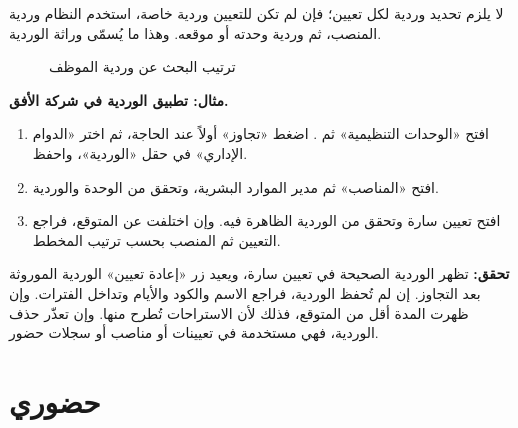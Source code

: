 لا يلزم تحديد وردية لكل تعيين؛ فإن لم تكن للتعيين وردية خاصة، استخدم النظام وردية المنصب، ثم وردية وحدته أو موقعه. وهذا ما يُسمّى وراثة الوردية.

\begin{figure}[H]
\centering
{}
\rclegend
\caption{ترتيب البحث عن وردية الموظف}
\label{fig:hr-shift-order}
\end{figure}


\textbf{مثال: تطبيق الوردية في شركة الأفق.}

\begin{enumerate}
  \item افتح «الوحدات التنظيمية» ثم . اضغط «تجاوز» أولاً عند الحاجة، ثم اختر «الدوام الإداري» في حقل «الوردية»، واحفظ.
  \item افتح «المناصب» ثم مدير الموارد البشرية، وتحقق من الوحدة والوردية.
  \item افتح تعيين سارة وتحقق من الوردية الظاهرة فيه. وإن اختلفت عن المتوقع، فراجع التعيين ثم المنصب بحسب ترتيب المخطط.
\end{enumerate}

\textbf{تحقق:} تظهر الوردية الصحيحة في تعيين سارة، ويعيد زر «إعادة تعيين» الوردية الموروثة بعد التجاوز. إن لم تُحفظ الوردية، فراجع الاسم والكود والأيام وتداخل الفترات. وإن ظهرت المدة أقل من المتوقع، فذلك لأن الاستراحات تُطرح منها. وإن تعذّر حذف الوردية، فهي مستخدمة في تعيينات أو مناصب أو سجلات حضور.

\clearpage
\section{حضوري}
\label{sec:hr-feature-my-attendance}

